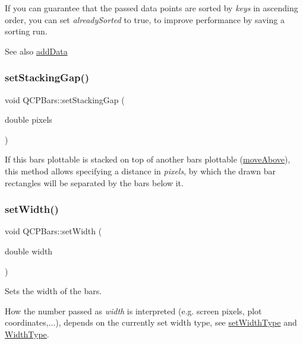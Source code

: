 If you can guarantee that the passed data points are sorted by {\itshape keys} in ascending order, you can set {\itshape already\+Sorted} to true, to improve performance by saving a sorting run.

\begin{DoxySeeAlso}{See also}
\mbox{\hyperlink{class_q_c_p_bars_a323d6970d6d6e3166d89916a7f60f733}{add\+Data}} 
\end{DoxySeeAlso}
\mbox{\label{class_q_c_p_bars_aeacf7561afb1c70284b22822b57c7bb5}} 
\subsubsection{\texorpdfstring{setStackingGap()}{setStackingGap()}}
{\footnotesize\ttfamily void Q\+C\+P\+Bars\+::set\+Stacking\+Gap (\begin{DoxyParamCaption}\item[{double}]{pixels }\end{DoxyParamCaption})}

If this bars plottable is stacked on top of another bars plottable (\mbox{\hyperlink{class_q_c_p_bars_ac22e00a6a41509538c21b04f0a57318c}{move\+Above}}), this method allows specifying a distance in {\itshape pixels}, by which the drawn bar rectangles will be separated by the bars below it. \mbox{\label{class_q_c_p_bars_afec6116579d44d5b706e0fa5e5332507}} 
\subsubsection{\texorpdfstring{setWidth()}{setWidth()}}
{\footnotesize\ttfamily void Q\+C\+P\+Bars\+::set\+Width (\begin{DoxyParamCaption}\item[{double}]{width }\end{DoxyParamCaption})}

Sets the width of the bars.

How the number passed as {\itshape width} is interpreted (e.\+g. screen pixels, plot coordinates,...), depends on the currently set width type, see \mbox{\hyperlink{class_q_c_p_bars_adcaa3b41281bb2c0f7949b341592fcc0}{set\+Width\+Type}} and \mbox{\hyperlink{class_q_c_p_bars_a65dbbf1ab41cbe993d71521096ed4649}{Width\+Type}}. \mbox{\label{class_q_c_p_bars_adcaa3b41281bb2c0f7949b341592fcc0}} 
